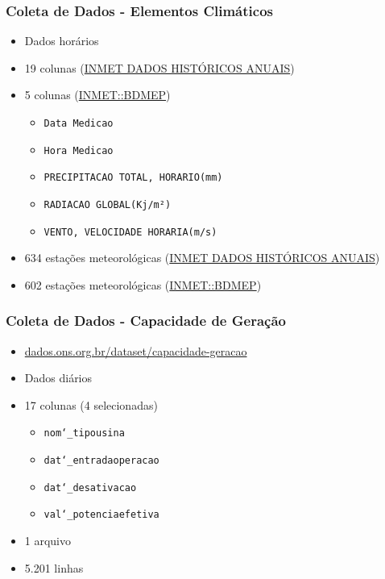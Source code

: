 \documentclass{beamer}
\begin{document}
\begin{frame}
\frametitle{Coleta de Dados - Elementos Climáticos}
\begin{itemize}
    \item Dados horários
    \item 19 colunas (\href{https://portal.inmet.gov.br/dadoshistoricos}{INMET DADOS HISTÓRICOS ANUAIS})
    \item 5 colunas (\href{https://bdmep.inmet.gov.br}{INMET::BDMEP})
    \begin{itemize}
        \item \texttt{Data Medicao}
        \item \texttt{Hora Medicao}
        \item \texttt{PRECIPITACAO TOTAL, HORARIO(mm)}
        \item \texttt{RADIACAO GLOBAL(Kj/m²)}
        \item \texttt{VENTO, VELOCIDADE HORARIA(m/s)}
    \end{itemize}
    \item 634 estações meteorológicas (\href{https://portal.inmet.gov.br/dadoshistoricos}{INMET DADOS HISTÓRICOS ANUAIS})
    \item 602 estações meteorológicas (\href{https://bdmep.inmet.gov.br}{INMET::BDMEP})
\end{itemize}
\end{frame}


\begin{frame}
\frametitle{Coleta de Dados - Capacidade de Geração}
\begin{itemize}
    \item \href{https://dados.ons.org.br/dataset/capacidade-geracao}{dados.ons.org.br/dataset/capacidade-geracao}
    \item Dados diários
    \item 17 colunas (4 selecionadas)
    \begin{itemize}
        \item \texttt{nom\char`_tipousina}
        \item \texttt{dat\char`_entradaoperacao}
        \item \texttt{dat\char`_desativacao}
        \item \texttt{val\char`_potenciaefetiva}
    \end{itemize}
    \item 1 arquivo
    \item 5.201 linhas
\end{itemize}
\end{frame}
\end{document}
